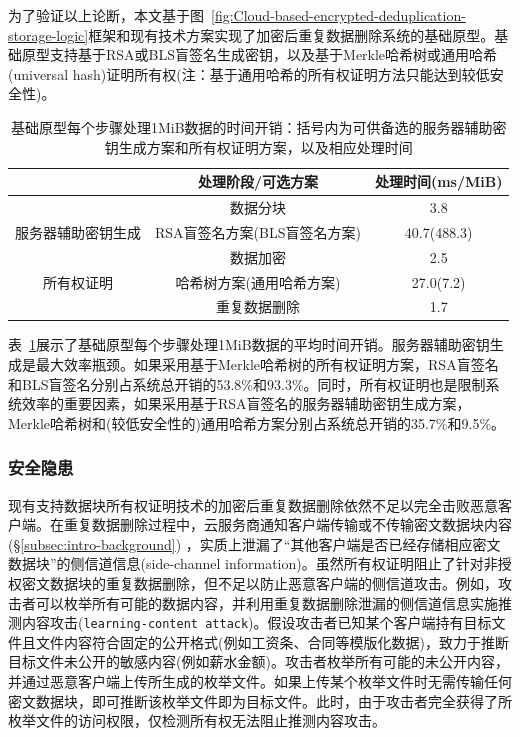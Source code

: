 为了验证以上论断，本文基于图~\ref{fig:Cloud-based-encrypted-deduplication-storage-logic}框架和现有技术方案实现了加密后重复数据删除系统的基础原型。基础原型支持基于RSA\cite{bellare2013DupLESS}或BLS\cite{armknecht2015transparent}盲签名生成密钥，以及基于Merkle哈希树\cite{halevi2011proofs}或通用哈希(universal hash)\cite{xu2013weak}证明所有权(注：基于通用哈希的所有权证明方法\cite{xu2013weak}只能达到较低安全性)。

\begin{table}[!htb]
    \small
    \centering
    \begin{tabular}{@{}ccc@{}}
        \toprule
                                    & 处理阶段/可选方案            & 处理时间(ms/MiB) \\ \midrule
                                    & 数据分块                     & 3.8              \\
        服务器辅助密钥生成          & RSA盲签名方案(BLS盲签名方案) & 40.7(488.3)      \\
        \multirow{3}{*}{所有权证明} & 数据加密                     & 2.5              \\
                                    & 哈希树方案(通用哈希方案)     & 27.0(7.2)        \\
                                    & 重复数据删除                 & 1.7              \\ \bottomrule
    \end{tabular}
    \caption{基础原型每个步骤处理1MiB数据的时间开销：括号内为可供备选的服务器辅助密钥生成方案和所有权证明方案，以及相应处理时间}
    \label{tab:intro-bottleneck}
\end{table}

表~\ref{tab:intro-bottleneck}展示了基础原型每个步骤处理1MiB数据的平均时间开销。服务器辅助密钥生成是最大效率瓶颈。如果采用基于Merkle哈希树的所有权证明方案，RSA盲签名和BLS盲签名分别占系统总开销的53.8\%和93.3\%。同时，所有权证明也是限制系统效率的重要因素，如果采用基于RSA盲签名的服务器辅助密钥生成方案，Merkle哈希树和(较低安全性的)通用哈希方案分别占系统总开销的35.7\%和9.5\%。

\subsubsection{安全隐患}
\label{subsubsec:intro-problem-security}

现有支持数据块所有权证明技术的加密后重复数据删除依然不足以完全击败恶意客户端。在重复数据删除过程中，云服务商通知客户端传输或不传输密文数据块内容(\S\ref{subsec:intro-background}) ，实质上泄漏了“其他客户端是否已经存储相应密文数据块”的侧信道信息(side-channel information)。虽然所有权证明阻止了针对非授权密文数据块的重复数据删除，但不足以防止恶意客户端的侧信道攻击。例如，攻击者可以枚举所有可能的数据内容，并利用重复数据删除泄漏的侧信道信息实施推测内容攻击({\tt learning-content attack})\cite{harnik2010side,zuo2018mitigating}。假设攻击者已知某个客户端持有目标文件且文件内容符合固定的公开格式(例如工资条、合同等模版化数据)，致力于推断目标文件未公开的敏感内容(例如薪水金额)。攻击者枚举所有可能的未公开内容，并通过恶意客户端上传所生成的枚举文件。如果上传某个枚举文件时无需传输任何密文数据块，即可推断该枚举文件即为目标文件。此时，由于攻击者完全获得了所枚举文件的访问权限，仅检测所有权无法阻止推测内容攻击。


